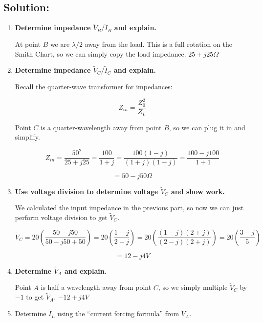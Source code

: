 \documentclass{article}
\begin{document}
\subsection{Solution:}

\begin{enumerate}
    \item \textbf{Determine impedance $\tilde{V}_B/\tilde{I}_B$ and explain.}

    At point $B$ we are $\lambda/2$ away from the load. This is a full rotation on the Smith Chart, so we can simply copy the load impedance. $\boxed{25 + j25 \Omega}$

    \vfill
    
    \item \textbf{Determine impedance $\tilde{V}_C/\tilde{I}_C$ and explain.}

    Recall the quarter-wave transformer for impedances:

    $$Z_{in} = \frac{Z_0^2}{Z_L}$$

    Point $C$ is a quarter-wavelength away from point $B$, so we can plug it in and simplify.

    $$Z_{in} = \frac{50^2}{25 + j25} = \frac{100}{1 + j} = \frac{100(1 - j)}{(1 + j)(1 - j)} = \frac{100 - j100}{1 + 1}$$

    $$= \boxed{50 - j50 \Omega}$$

    \vfill
    
    \item \textbf{Use voltage division to determine voltage $\tilde{V}_C$ and show work.}

    We calculated the input impedance in the previous part, so now we can just perform voltage division to get $\tilde{V}_C$.

    $$\tilde{V}_C = 20 \left(\frac{50 - j50}{50 - j50 + 50} \right) = 20 \left(\frac{1 - j}{2 - j} \right) = 20 \left(\frac{(1 - j)(2 + j)}{(2 - j)(2 + j)} \right) = 20 \left(\frac{3 - j}{5} \right)$$

    $$= \boxed{12 - j4 V}$$

    \vfill
    \newpage
    
    \item \textbf{Determine $\tilde{V}_A$ and explain.}

    Point $A$ is half a wavelength away from point $C$, so we simply multiple $\tilde{V}_C$ by $-1$ to get $\tilde{V}_A$. $\boxed{-12 + j4 V}$

    \vfill
    
    \item Determine $\tilde{I}_L$ using the ``current forcing formula'' from $\tilde{V}_A$.


\end{enumerate}
\end{document}
